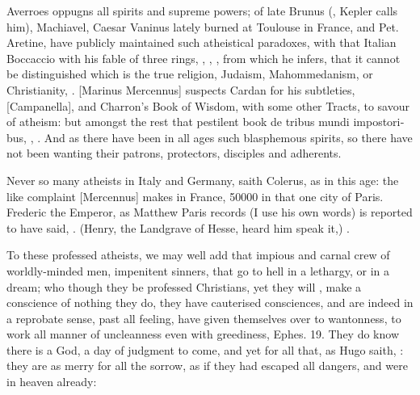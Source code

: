 {Averroes oppugns all spirits and supreme powers; of late Brunus
(, Kepler calls him), Machiavel, Caesar Vaninus
lately burned at Toulouse in France, and Pet. Aretine, have publicly
maintained such atheistical paradoxes, with that Italian
Boccaccio with his fable of three rings, \etc{}, , \etc{}, from which he infers, that it
cannot be distinguished which is the true religion, Judaism,
Mahommedanism, or Christianity, \etc{}. [Marinus Mercennus] suspects
Cardan for his subtleties, [Campanella], and Charron's Book of Wisdom,
with some other Tracts, to savour of atheism: but amongst the
rest that pestilent book \textlatin{de tribus mundi impostoribus}, , \etc{}. And
as there have been in all ages such blasphemous spirits, so there have
not been wanting their patrons, protectors, disciples and adherents.

Never so many atheists in Italy and Germany, saith Colerus, as in
this age: the like complaint [Mercennus] makes in France, 50\thinspace{}000 in that
one city of Paris. Frederic the Emperor, as Matthew Paris records
 (I use his own words) is reported to have
said, . (Henry, the
Landgrave of Hesse, heard him speak it,) .

To these professed atheists, we may well add that impious and carnal
crew of worldly-minded men, impenitent sinners, that go to hell in a
lethargy, or in a dream; who though they be professed Christians, yet
they will , make a conscience of nothing they do,
they have cauterised consciences, and are indeed in a reprobate sense,
past all feeling, have given themselves over to wantonness, to work all
manner of uncleanness even with greediness, Ephes.  19. They do know
there is a God, a day of judgment to come, and yet for all that, as
Hugo saith, : they are as
merry for all the sorrow, as if they had escaped all dangers, and were
in heaven already:

}
